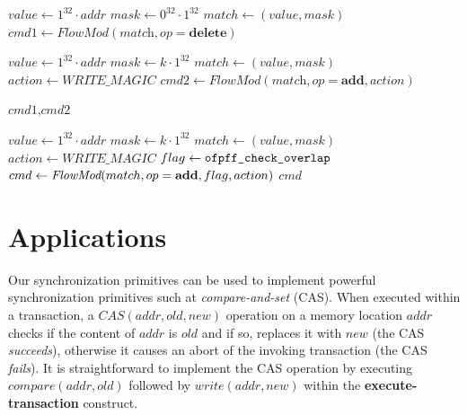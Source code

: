 \documentclass{sig-alternate-2006}
\newcommand{\concat}[0]{\cdot}
\newcommand{\cas}{CAS\xspace}
\newcommand{\compare}{compare\xspace}
\newcommand{\memwrite}{write\xspace}
\newcommand{\addr}{\textit{addr}\xspace}
\newcommand{\add}{\textbf{add}\xspace}
\newcommand{\dele}{\textbf{delete}\xspace}
\newcommand{\checko}{\texttt{check\_overlap}\xspace}
\newcommand{\execatomic}{\textbf{execute-transaction}}
\newcommand{\true}{\textit{true}}
\newcommand{\false}{\textit{false}}
\newcommand{\ones}[1]{1^{#1}}
\newcommand{\zeros}[1]{0^{#1}}
\newcommand{\memmagic}{\textit{WRITE\_MAGIC}}
\begin{document}

{\scriptsize

\begin{algorithm}[t]
    \caption{$\textit{write}(\addr,k)$}
    \label{alg:write}
    \begin{algorithmic}[1]
    		\State $value \gets \ones{32}\concat\addr$
    		\State $mask \gets  \zeros{32}\concat\ones{32}$
    		\State $match \gets (value,mask)$
    		\State $\textit{cmd1}\gets \textit{FlowMod}(\textit{match}, op = \dele) $
    		
  		   \State $value \gets \ones{32}\concat\addr$
  		   \State $mask \gets  k\concat\ones{32}$
  		   \State $match \gets (value,mask)$
 		   \State $action \gets \memmagic$
		   \State $\textit{cmd2}\gets \textit{FlowMod}(\textit{match}, op = \add,  \textit{action}) $
		    		
			\Return $\textit{cmd1}$,$\textit{cmd2}$
    \end{algorithmic}
\end{algorithm}

\begin{algorithm}[t]
    \caption{$\textit{\compare}(\addr,k)$}
    \label{alg:compare}
    \begin{algorithmic}[1]
    		\State $value \gets \ones{32}\concat\addr$
    		\State $mask \gets  k\concat\ones{32}$
    		\State $match \gets (value,mask)$
    		\State $action \gets \memmagic$
    		\State $flag \gets \texttt{ofpff\_\checko}$
    		\State $cmd\gets \emph{FlowMod}(match, op = \add, flag, action) $
			\Return $cmd$
    \end{algorithmic}
\end{algorithm}
}


\section{Applications}\label{sec:apps}

Our synchronization primitives can be used to 
implement powerful synchronization primitives such at
\emph{compare-and-set} (CAS).
When executed within a transaction, a $\cas(\addr,\textit{old},\textit{new})$ operation 
on a memory location $\addr$
checks if the content of $\addr$ is $\textit{old}$ and if so,
replaces it with $\textit{new}$ %
(the CAS \emph{succeeds}), otherwise it 
causes an abort of the invoking transaction
(the CAS \emph{fails}).
It is straightforward to implement the CAS operation by executing
$\textit{\compare}(\addr, old)$ followed by $\textit{\memwrite}(\addr,
new)$ within the {\execatomic} construct.
\end{document}
